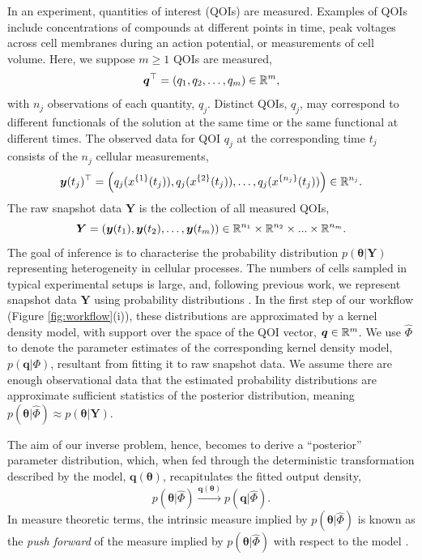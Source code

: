 In an experiment, quantities of interest (QOIs) are measured. Examples of QOIs include concentrations of compounds at different points in time, peak voltages across cell membranes during an action potential, or measurements of cell volume. Here, we suppose $m\geq 1$ QOIs are measured,
%
\begin{equation}
\boldsymbol{q}^\top = \left( q_1, q_2, \dots, q_m \right) \in \mathbb{R}^m,
\end{equation}
%
with $n_j$ observations of each quantity, $q_j$. Distinct QOIs, $q_j$, may correspond to different functionals of the solution at the same time or the same functional at different times. The observed data for QOI $q_j$ at the corresponding time $t_j$ consists of the $n_j$ cellular measurements,
%
\begin{equation}
\boldsymbol{y}(t_j)^\top = \left( q_j(x^{\{1\}}(t_j)), q_j(x^{\{2\}}(t_j)), \dots, q_j(x^{\{n_j\}}(t_j))  \right) \in \mathbb{R}^{n_j}.
\end{equation}
%
The raw snapshot data $\boldsymbol{Y}$ is the collection of all measured QOIs,
%
\begin{equation}
\boldsymbol{Y} = \left( \boldsymbol{y}(t_1), \boldsymbol{y}(t_2), \dots, \boldsymbol{y}(t_m) \right) \in \mathbb{R}^{n_1} \times \mathbb{R}^{n_2}\times...\times\mathbb{R}^{n_m}.
\end{equation}
%
The goal of inference is to characterise the probability distribution $p(\boldsymbol{\theta}|\boldsymbol{Y})$ representing heterogeneity in cellular processes. The numbers of cells sampled in typical experimental setups is large, and, following previous work, we represent snapshot data $\boldsymbol{Y}$ using probability distributions \cite{hasenauer2011identification,hasenauer2014ode,loos2018hierarchical,dixit2018maximum}. In the first step of our workflow (Figure \ref{fig:workflow}(i)), these distributions are approximated by a kernel density model, with support over the space of the QOI vector, $\boldsymbol{q}\in\mathbb{R}^m$. We use $\hat{\Phi}$ to denote the parameter estimates of the corresponding kernel density model, $p(\boldsymbol{q}|\Phi)$, resultant from fitting it to raw snapshot data. We assume there are enough observational data that the estimated probability distributions are approximate sufficient statistics of the posterior distribution, meaning $p(\boldsymbol{\theta}|\hat{\Phi}) \approx p(\boldsymbol{\theta}|\boldsymbol{Y})$.

The aim of our inverse problem, hence, becomes to derive a ``posterior'' parameter distribution, which, when fed through the deterministic transformation described by the model, $\boldsymbol{q}(\boldsymbol{\theta})$, recapitulates the fitted output density,
%
\begin{equation}
p(\boldsymbol{\theta}|\hat{\Phi}) \xrightarrow{\boldsymbol{q}(\boldsymbol{\theta})} p(\boldsymbol{q}|\hat{\Phi}).
\end{equation}
%
In measure theoretic terms, the intrinsic measure implied by $p(\boldsymbol{\theta}|\hat{\Phi})$ is known as the \textit{push forward} of the measure implied by $p(\boldsymbol{\theta}|\hat{\Phi})$ with respect to the model \cite{BJW-18}.


